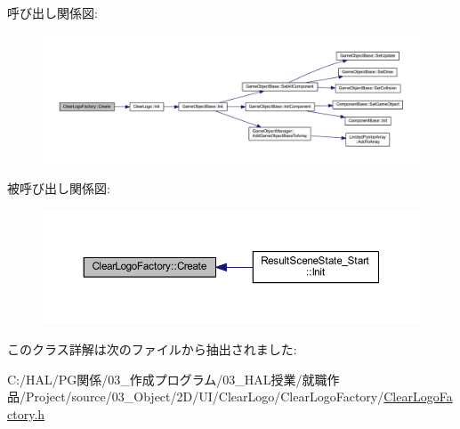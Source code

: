 呼び出し関係図\+:\nopagebreak
\begin{figure}[H]
\begin{center}
\leavevmode
\includegraphics[width=350pt]{class_clear_logo_factory_a98ea5747e5605f30d58be670ad4cac4a_cgraph}
\end{center}
\end{figure}
被呼び出し関係図\+:\nopagebreak
\begin{figure}[H]
\begin{center}
\leavevmode
\includegraphics[width=350pt]{class_clear_logo_factory_a98ea5747e5605f30d58be670ad4cac4a_icgraph}
\end{center}
\end{figure}


このクラス詳解は次のファイルから抽出されました\+:\begin{DoxyCompactItemize}
\item 
C\+:/\+H\+A\+L/\+P\+G関係/03\+\_\+作成プログラム/03\+\_\+\+H\+A\+L授業/就職作品/\+Project/source/03\+\_\+\+Object/2\+D/\+U\+I/\+Clear\+Logo/\+Clear\+Logo\+Factory/\mbox{\hyperlink{_clear_logo_factory_8h}{Clear\+Logo\+Factory.\+h}}\end{DoxyCompactItemize}
